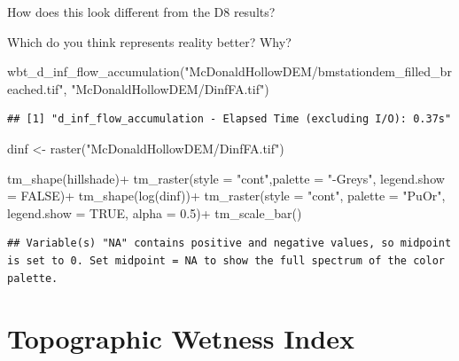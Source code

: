 \documentclass[
]{book}
\newenvironment{Shaded}{\begin{snugshade}}{\end{snugshade}}
\newcommand{\AttributeTok}[1]{\textcolor[rgb]{0.77,0.63,0.00}{#1}}
\newcommand{\ConstantTok}[1]{\textcolor[rgb]{0.00,0.00,0.00}{#1}}
\newcommand{\FloatTok}[1]{\textcolor[rgb]{0.00,0.00,0.81}{#1}}
\newcommand{\FunctionTok}[1]{\textcolor[rgb]{0.00,0.00,0.00}{#1}}
\newcommand{\NormalTok}[1]{#1}
\newcommand{\OtherTok}[1]{\textcolor[rgb]{0.56,0.35,0.01}{#1}}
\newcommand{\SpecialCharTok}[1]{\textcolor[rgb]{0.00,0.00,0.00}{#1}}
\newcommand{\StringTok}[1]{\textcolor[rgb]{0.31,0.60,0.02}{#1}}
\begin{document}
How does this look different from the D8 results?

Which do you think represents reality better? Why?

\begin{Shaded}
\begin{Highlighting}[]
\FunctionTok{wbt\_d\_inf\_flow\_accumulation}\NormalTok{(}\StringTok{"McDonaldHollowDEM/bmstationdem\_filled\_breached.tif"}\NormalTok{,}
                         \StringTok{"McDonaldHollowDEM/DinfFA.tif"}\NormalTok{)}
\end{Highlighting}
\end{Shaded}

\begin{verbatim}
## [1] "d_inf_flow_accumulation - Elapsed Time (excluding I/O): 0.37s"
\end{verbatim}

\begin{Shaded}
\begin{Highlighting}[]
\NormalTok{dinf }\OtherTok{\textless{}{-}} \FunctionTok{raster}\NormalTok{(}\StringTok{"McDonaldHollowDEM/DinfFA.tif"}\NormalTok{)}

\FunctionTok{tm\_shape}\NormalTok{(hillshade)}\SpecialCharTok{+}
  \FunctionTok{tm\_raster}\NormalTok{(}\AttributeTok{style =} \StringTok{"cont"}\NormalTok{,}\AttributeTok{palette =} \StringTok{"{-}Greys"}\NormalTok{, }\AttributeTok{legend.show =} \ConstantTok{FALSE}\NormalTok{)}\SpecialCharTok{+}
\FunctionTok{tm\_shape}\NormalTok{(}\FunctionTok{log}\NormalTok{(dinf))}\SpecialCharTok{+}
  \FunctionTok{tm\_raster}\NormalTok{(}\AttributeTok{style =} \StringTok{"cont"}\NormalTok{, }\AttributeTok{palette =} \StringTok{"PuOr"}\NormalTok{, }\AttributeTok{legend.show =} \ConstantTok{TRUE}\NormalTok{, }\AttributeTok{alpha =} \FloatTok{0.5}\NormalTok{)}\SpecialCharTok{+}
  \FunctionTok{tm\_scale\_bar}\NormalTok{()}
\end{Highlighting}
\end{Shaded}

\begin{verbatim}
## Variable(s) "NA" contains positive and negative values, so midpoint is set to 0. Set midpoint = NA to show the full spectrum of the color palette.
\end{verbatim}

\hypertarget{topographic-wetness-index}{%
\section{Topographic Wetness Index}\label{topographic-wetness-index}}
\end{document}
